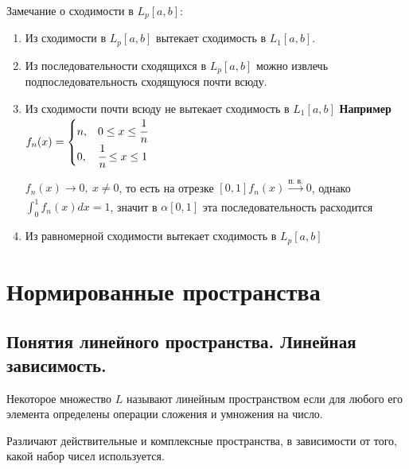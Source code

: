 \documentclass[12pt]{report}
\newcommand{\be}{\begin{enumerate}}
\newcommand{\ee}{\end{enumerate}}
\renewcommand{\[}{$\\\displaystyle}
\renewcommand{\]}{\\$}
\renewcommand{\[}{$\\\displaystyle}
\newcommand{\sep}{,\ }
\begin{document}
Замечание о сходимости в $L_p[a,b]$:
\be
  \item Из сходимости в $L_p[a,b]$ вытекает сходимость в $L_1[a,b]$.
  \item Из последовательности сходящихся в $L_p[a,b]$ можно извлечь подпоследовательность сходящуюся почти всюду.
  \item Из сходимости почти всюду не вытекает сходимость в $L_1[a,b]$
  \textbf{Например}
  $f_n(x)=\begin{cases} n, & 0 \leq x \leq \cfrac{1}{n} \\ 0, & \cfrac{1}{n} \leq x \leq 1 \end{cases}$

  $f_n(x) \rightarrow 0 \sep x \neq 0$, то есть на отрезке $[0,1] f_n(x) \xrightarrow[]{\text{п. в.}} 0$, однако $\int_0^1 f_n(x) dx = 1$, значит в $\alpha [0,1]$ эта последовательность расходится
  \item Из равномерной сходимости вытекает сходимость в $L_p[a,b]$
\ee

\chapter{Нормированные пространства}

\section{Понятия линейного пространства. Линейная зависимость.}

Некоторое множество $L$ называют линейным пространством если для любого его элемента определены операции сложения и умножения на число.

Различают действительные и комплексные пространства, в зависимости от того, какой набор чисел используется.
\end{document}
